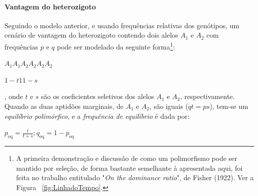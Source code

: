 \begin{refsection}
\paragraph{Vantagem do heterozigoto}
Seguindo o modelo anterior, e usando frequências relativas dos genótipos, um cenário de vantagem do heterozigoto contendo dois alelos $A_{1}$ e $A_{2}$ com frequências $p$ e $q$ pode ser modelado da seguinte forma\footnote{A primeira demonstração e discussão de como um polimorfismo pode ser mantido por seleção, de forma bastante semelhante à apresentada aqui, foi feita no trabalho entitulado "\emph{On the dominance ratio}", de Fisher (1922). Ver a Figura ~\ref{fig:LinhadoTempo}.}:\\

\centerline{$A_{1}A_{1}$\space\space\space\space $A_{2}A_{2}$\space\space\space\space $A_{2}A_{2}$} 

\centerline{$1-t$\space\space\space\space $1$\space\space\space\space \space\space$1-s$}

, onde $t$ e $s$ são os coeficientes seletivos dos alelos $A_{1}$ e $A_{2}$, respectivamente. Quando as duas aptidões marginais, de $A_{1}$ e $A_{2}$, são iguais ($qt=ps$), tem-se um \emph{equilíbrio polimórfico}, e a \emph{frequência de equilíbrio} é dada por:\\
\medskip
\centerline{$p_{\mathrm{eq}} = \frac{t}{t+s}; q_{\mathrm{eq}}=1-p_{\mathrm{eq}}$}
\medskip
\par 



\end{refsection}
